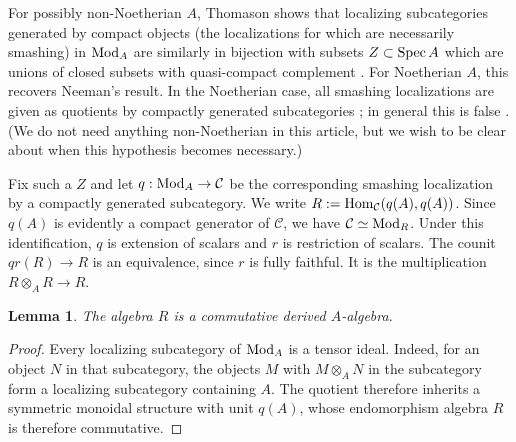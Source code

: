 \documentclass[12pt, letter]{amsart}
\newtheorem{lemma}[theorem]{Lemma}
\theoremstyle{definition}
\numberwithin{equation}{section}
\begin{document}
For possibly non-Noetherian $A$, Thomason shows that localizing subcategories generated by compact objects (the localizations for which are necessarily smashing) in $\operatorname{Mod}_A$ are similarly in bijection with subsets $Z\subset\operatorname{Spec} A$ which are unions of closed subsets with quasi-compact complement \cite[Theorem~3.15]{Thomason}.  For Noetherian $A$, this recovers Neeman's result.  In the Noetherian case, all smashing localizations are given as quotients by compactly generated subcategories \cite[Corollary~3.4]{Neeman}; in general this is false \cite[Section~2, Proposition]{Keller-smashing}.
(We do not need anything non-Noetherian in this article, but we wish to be clear about when this hypothesis becomes necessary.) 



Fix such a $Z$ and let $q: \operatorname{Mod}_A \to \mathcal{C}$ be the corresponding smashing localization by a compactly generated subcategory.  We write $R := \operatorname{Hom}_{\mathcal{C}}(q(A), q(A))$.  Since $q(A)$ is evidently a compact generator of $\mathcal{C}$, we have $\mathcal{C} \simeq \operatorname{Mod}_R$.
Under this identification, 
$q$ is extension of scalars and $r$ is
restriction of scalars. The counit $qr(R)\to R$ is an equivalence,
since $r$ is fully faithful. It is the multiplication
$R\otimes_A R\to R$.

\begin{lemma}\label{lem:smashing-unit}
The algebra $R$ is a commutative derived $A$-algebra.
\end{lemma}
\begin{proof}
Every localizing subcategory of $\operatorname{Mod}_A$ is a tensor ideal.
Indeed, for an object $N$ in that subcategory, the objects $M$ with
$M\otimes_A N$ in the subcategory form a localizing subcategory containing $A$.
The quotient therefore inherits a symmetric monoidal structure with
unit $q(A)$, whose endomorphism algebra $R$ is therefore commutative.
\end{proof}
\end{document}
